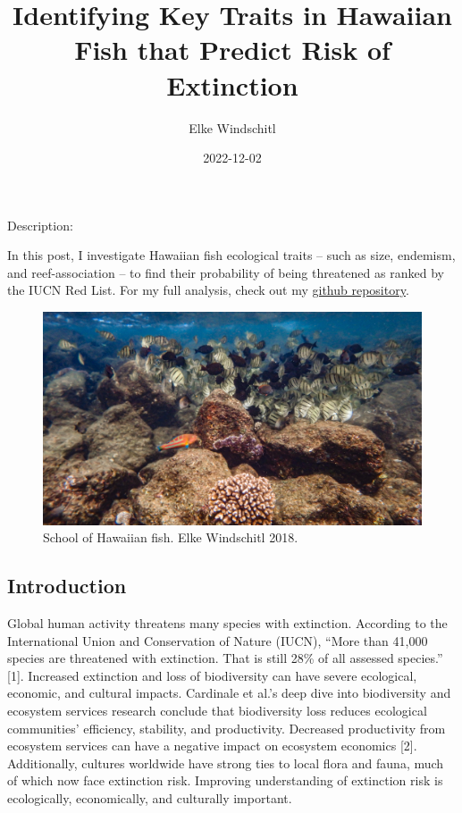 \documentclass[
  letterpaper,
  DIV=11,
  numbers=noendperiod]{scrartcl}
\title{Identifying Key Traits in Hawaiian Fish that Predict Risk of
Extinction}
\author{Elke Windschitl}
\date{2022-12-02}
\begin{document}
\maketitle
\ifdefined\Shaded\renewenvironment{Shaded}{\begin{tcolorbox}[boxrule=0pt, frame hidden, interior hidden, borderline west={3pt}{0pt}{shadecolor}, enhanced, sharp corners, breakable]}{\end{tcolorbox}}\fi

Description:

In this post, I investigate Hawaiian fish ecological traits -- such as
size, endemism, and reef-association -- to find their probability of
being threatened as ranked by the IUCN Red List. For my full analysis,
check out my
\href{https://github.com/elkewind/eds-222-final-project}{github
repository}.

\begin{figure}

{\centering \includegraphics{fish_pic.JPG}

}

\caption{School of Hawaiian fish. Elke Windschitl 2018.}

\end{figure}

\hypertarget{introduction}{%
\subsection{Introduction}\label{introduction}}

Global human activity threatens many species with extinction. According
to the International Union and Conservation of Nature (IUCN), ``More
than 41,000 species are threatened with extinction. That is still 28\%
of all assessed species.'' {[}1{]}. Increased extinction and loss of
biodiversity can have severe ecological, economic, and cultural impacts.
Cardinale et al.'s deep dive into biodiversity and ecosystem services
research conclude that biodiversity loss reduces ecological communities'
efficiency, stability, and productivity. Decreased productivity from
ecosystem services can have a negative impact on ecosystem economics
{[}2{]}. Additionally, cultures worldwide have strong ties to local
flora and fauna, much of which now face extinction risk. Improving
understanding of extinction risk is ecologically, economically, and
culturally important.
\end{document}
